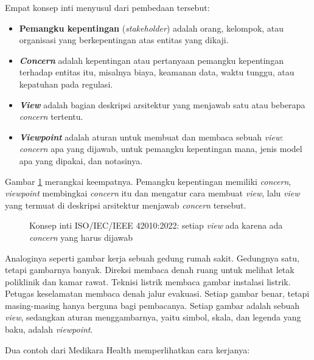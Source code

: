 Empat konsep inti menyusul dari pembedaan tersebut:

\begin{itemize}
  \item \textbf{Pemangku kepentingan} (\textit{stakeholder}) adalah orang,
        kelompok, atau organisasi yang berkepentingan atas entitas yang
        dikaji.
  \item \textbf{\textit{Concern}} adalah kepentingan atau pertanyaan pemangku
        kepentingan terhadap entitas itu, misalnya biaya, keamanan data,
        waktu tunggu, atau kepatuhan pada regulasi.
  \item \textbf{\textit{View}} adalah bagian deskripsi arsitektur yang
        menjawab satu atau beberapa \textit{concern} tertentu.
  \item \textbf{\textit{Viewpoint}} adalah aturan untuk membuat dan membaca
        sebuah \textit{view}: \textit{concern} apa yang dijawab, untuk
        pemangku kepentingan mana, jenis model apa yang dipakai, dan
        notasinya.
\end{itemize}

Gambar \ref{fig:ch02-konsep-42010} merangkai keempatnya. Pemangku
kepentingan memiliki \textit{concern}, \textit{viewpoint} membingkai
\textit{concern} itu dan mengatur cara membuat \textit{view}, lalu
\textit{view} yang termuat di deskripsi arsitektur menjawab \textit{concern}
tersebut.

\begin{figure}[!htb]
  \centering
  
  \caption{Konsep inti ISO/IEC/IEEE 42010:2022: setiap \textit{view} ada
           karena ada \textit{concern} yang harus dijawab}
  \label{fig:ch02-konsep-42010}
\end{figure}

Analoginya seperti gambar kerja sebuah gedung rumah sakit. Gedungnya satu,
tetapi gambarnya banyak. Direksi membaca denah ruang untuk melihat letak
poliklinik dan kamar rawat. Teknisi listrik membaca gambar instalasi listrik.
Petugas keselamatan membaca denah jalur evakuasi. Setiap gambar benar, tetapi
masing-masing hanya berguna bagi pembacanya. Setiap gambar adalah sebuah
\textit{view}, sedangkan aturan menggambarnya, yaitu simbol, skala, dan
legenda yang baku, adalah \textit{viewpoint}.

Dua contoh dari Medikara Health memperlihatkan cara kerjanya:

